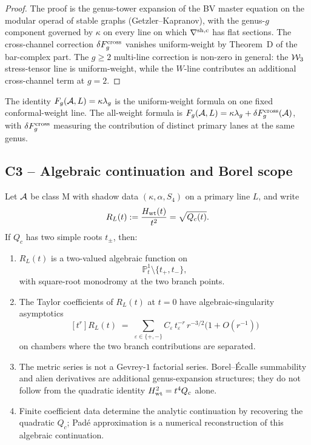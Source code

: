 \begin{proof}
The proof is the genus-tower expansion of the BV master equation on
the modular operad of stable graphs (Getzler--Kapranov), with the
genus-$g$ component governed by $\kappa$ on every line on which
$\nabla^{\rm sh, c}$ has flat sections. The cross-channel correction
$\delta F_g^{\rm cross}$ vanishes uniform-weight by
Theorem~D of the bar-complex part. The $g \ge 2$ multi-line correction
is non-zero in general: the $\mathcal{W}_3$ stress-tensor line is
uniform-weight, while the $W$-line contributes an additional
cross-channel term at $g=2$.
\end{proof}

\begin{remark}
\label{rem:c2-uniform-weight-tag}
The identity $F_g(\mathcal{A},L)=\kappa\lambda_g$ is the uniform-weight
formula on one fixed conformal-weight line. The all-weight formula is
$F_g(\mathcal{A},L)=\kappa\lambda_g+\delta F_g^{\rm cross}(\mathcal{A})$, with
$\delta F_g^{\rm cross}$ measuring the contribution of distinct
primary lanes at the same genus.
\end{remark}

\subsection{C3 -- Algebraic continuation and Borel scope}
\label{sec:c3-borel-pade}

\begin{theorem}
\label{thm:borel-summability-classM}
\ClaimStatusProvedHere
Let $\mathcal{A}$ be class M with shadow data $(\kappa, \alpha, S_4)$ on a
primary line $L$, and write
\[
R_L(t) := \frac{H_{\rm wt}(t)}{t^2}=\sqrt{Q_c(t)}.
\]
If $Q_c$ has two simple roots $t_\pm$, then:
\begin{enumerate}[label=\textup{(\roman*)}]
\item\label{algcont:i} $R_L(t)$ is a two-valued algebraic function on
\[
\mathbb P^1_t\setminus\{t_+,t_-\},
\]
with square-root monodromy at the two branch points.
\item\label{algcont:ii} The Taylor coefficients of $R_L(t)$ at
$t=0$ have algebraic-singularity asymptotics
\[
[t^r]R_L(t)
\;=\;
\sum_{\varepsilon\in\{+,-\}}
C_\varepsilon\,t_\varepsilon^{-r}\,r^{-3/2}
\bigl(1+O(r^{-1})\bigr)
\]
on chambers where the two branch contributions are separated.
\item\label{algcont:iii} The metric series is not a Gevrey-$1$
factorial series. Borel--\'Ecalle summability and alien derivatives
are additional genus-expansion structures; they do not follow from
the quadratic identity $H_{\rm wt}^2=t^4Q_c$ alone.
\item\label{algcont:iv} Finite coefficient data determine the analytic
continuation by recovering the quadratic $Q_c$; Pad\'e approximation
is a numerical reconstruction of this algebraic continuation.
\end{enumerate}
\end{theorem}

